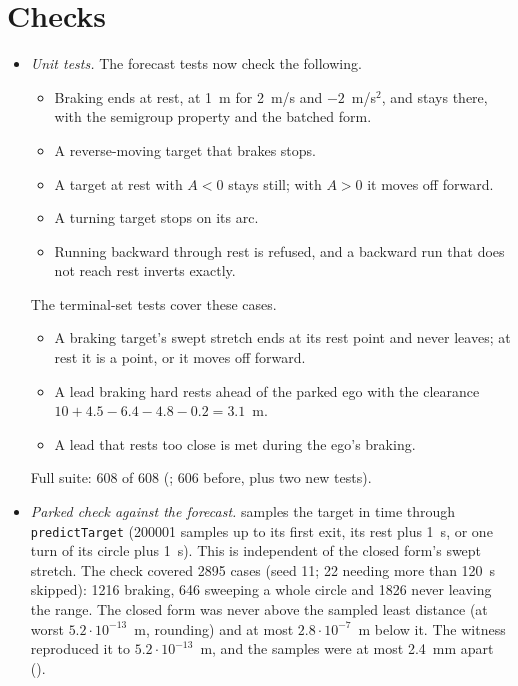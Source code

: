 \documentclass[11pt]{article}
\begin{document}
\section{Checks}
\begin{itemize}
\item \emph{Unit tests.} The forecast tests now check the following.
  \begin{itemize}
  \item Braking ends at rest, at 1~m for 2~m/s and $-2$~m/s$^2$, and stays
    there, with the semigroup property and the batched form.
  \item A reverse-moving target that brakes stops.
  \item A target at rest with $A<0$ stays still; with $A>0$ it moves off forward.
  \item A turning target stops on its arc.
  \item Running backward through rest is refused, and a backward run that
    does not reach rest inverts exactly.
  \end{itemize}
  The terminal-set tests cover these cases.
  \begin{itemize}
  \item A braking target's swept stretch ends at its rest point and never
    leaves; at rest it is a point, or it moves off forward.
  \item A lead braking hard rests ahead of the parked ego with the clearance
    $10+4.5-6.4-4.8-0.2=3.1$~m.
  \item A lead that rests too close is met during the ego's braking.
  \end{itemize}
  Full suite: 608 of 608 (; 606 before, plus two new tests).
\item \emph{Parked check against the forecast.}
   samples the target in time through
  \texttt{predictTarget} (200001 samples up to its first exit, its rest plus
  1~s, or one turn of its circle plus 1~s). This is independent of the
  closed form's swept stretch. The check covered 2895 cases (seed 11; 22
  needing more than 120~s skipped): 1216 braking, 646 sweeping a whole circle
  and 1826 never leaving the range. The closed form was never above the
  sampled least distance (at worst $5.2\cdot10^{-13}$~m, rounding) and at most
  $2.8\cdot10^{-7}$~m below it. The witness reproduced it to
  $5.2\cdot10^{-13}$~m, and the samples were at most 2.4~mm apart
  ().
\end{itemize}
\end{document}
